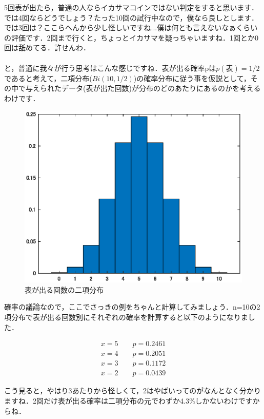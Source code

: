 \documentclass[11pt,a4paper,uplatex]{ujreport} 	%
\begin{document}
5回表が出たら，普通の人ならイカサマコインではない判定をすると思います．では4回ならどうでしょう？たった10回の試行中なので，僕なら良しとします．では3回は？ここらへんから少し怪しいですね...僕は何とも言えないなぁくらいの評価です．2回まで行くと，ちょっとイカサマを疑っちゃいますね．1回とか0回は舐めてる．許せんわ．\\\\

と，普通に我々が行う思考はこんな感じですね．表が出る確率pは$p(表)=1/2$であると考えて，二項分布($Bi(10,1/2)$)の確率分布に従う事を仮説として，その中で与えられたデータ(表が出た回数)が分布のどのあたりにあるのかを考えるわけです．

\begin{figure}[H]
  \label{im:bino}
    \centering
    \includegraphics[width=120mm]{../figures/bino.eps}
    \caption{表が出る回数の二項分布}
\end{figure}

確率の議論なので，ここでさっきの例をちゃんと計算してみましょう．n=10の2項分布で表が出る回数別にそれぞれの確率を計算すると以下のようになりました．

\begin{align}
  x=5 \qquad p = 0.2461 \nonumber \\
  x=4 \qquad p = 0.2051 \nonumber \\
  x=3 \qquad p = 0.1172 \nonumber\\
  x=2 \qquad p = 0.0439 \nonumber
\end{align}

こう見ると，やはり3あたりから怪しくて，2はやばいってのがなんとなく分かりますね．2回だけ表が出る確率は二項分布の元でわずか4.3\%しかないわけですからね．\\
\\
\end{document}
